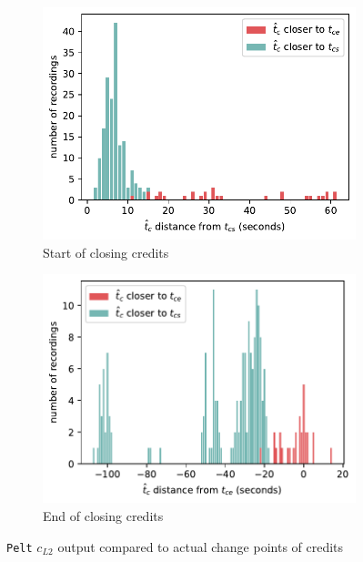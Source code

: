 \begin{figure}[h]
\begin{subfigure}[t]{.49\textwidth}
        \centering
        \includegraphics[width=\linewidth]{../plots/distances/pelt_l2_dist_end_first.pdf}
        \caption{Start of closing credits}
        \label{fig:t_diff_cs}
      \end{subfigure}
      \begin{subfigure}[t]{.49\textwidth}
        \centering
        \includegraphics[width=\linewidth]{../plots/distances/pelt_l2_dist_end_last.pdf}
        \caption{End of closing credits}
        \label{fig:t_diff_ce}
      \end{subfigure}
    \caption{\texttt{Pelt} $c_{L2}$ output compared to actual change points of credits}
    \label{fig:t_diff_credits}
\end{figure}

